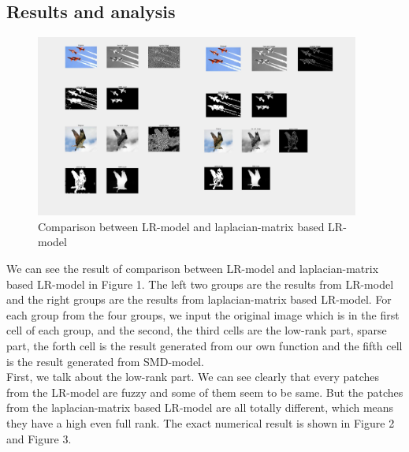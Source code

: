 \documentclass{article}
\begin{document}
\subsection{Results and analysis}

\begin{figure}[htbp]
	\centering
	\includegraphics[width=0.95\textwidth]{result.pdf}
	\caption{Comparison between LR-model and laplacian-matrix based LR-model}
\end{figure} 

We can see the result of comparison between LR-model and laplacian-matrix based 
LR-model in Figure 1. The left two groups are the results from LR-model and the 
right groups are the results from laplacian-matrix based LR-model. For each 
group from the four groups, we input the original image which is in the first 
cell of each group, and the second, the third cells are the low-rank part, 
sparse part, the forth cell is the result generated from our own function and 
the fifth cell is the result generated from SMD-model. \\
First, we talk about the low-rank part. We can see clearly that every patches 
from the LR-model are fuzzy and some of them seem to be same. But the patches 
from the laplacian-matrix based LR-model are all totally different, which means 
they have a high even full rank. The exact numerical result is shown in Figure 
2 and Figure 3. 
\end{document}
